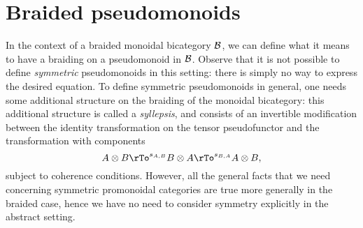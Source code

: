 \documentclass{robinthesisdraft}
\begin{document}
\section{Braided pseudomonoids}
In the context of a braided monoidal bicategory $\mathcal{B}$, we can define
what it means to have a braiding on a pseudomonoid in $\mathcal{B}$. Observe
that it is not possible to define \emph{symmetric} pseudomonoids
in this setting: there is simply no way to express the desired
equation. To define symmetric pseudomonoids in general, one needs
some additional structure on the braiding of the monoidal bicategory:
this additional structure is called a \emph{syllepsis}, and consists
of an invertible modification between the identity transformation
on the tensor pseudofunctor and the transformation with components
\[
	A\tn B \rTo^{s_{A,B}} B\tn A \rTo^{s_{B,A}} A\tn B,
\]
subject to coherence conditions. However, all the general facts
that we need concerning symmetric promonoidal categories are true
more generally in the braided case, hence we have no need to
consider symmetry explicitly in the abstract setting. 
\end{document}
